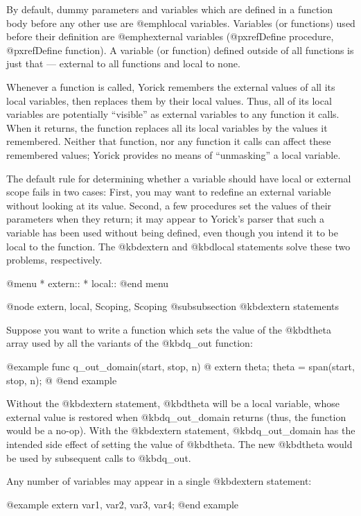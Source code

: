{By default, dummy parameters and variables which are defined in a
function body before any other use are @emph{local} variables.
Variables (or functions) used before their definition are
@emph{external} variables (@pxref{Define procedure}, @pxref{Define
function}).  A variable (or function) defined outside of all functions
is just that --- external to all functions and local to none.

Whenever a function is called, Yorick remembers the external values of
all its local variables, then replaces them by their local values.
Thus, all of its local variables are potentially ``visible'' as external
variables to any function it calls.  When it returns, the function
replaces all its local variables by the values it remembered.  Neither
that function, nor any function it calls can affect these remembered
values; Yorick provides no means of ``unmasking'' a local variable.

The default rule for determining whether a variable should have local or
external scope fails in two cases: First, you may want to redefine an
external variable without looking at its value.  Second, a few
procedures set the values of their parameters when they return; it may
appear to Yorick's parser that such a variable has been used without
being defined, even though you intend it to be local to the function.
The @kbd{extern} and @kbd{local} statements solve these two problems,
respectively.

@menu
* extern::                      
* local::                       
@end menu

@node extern, local, Scoping, Scoping
@subsubsection @kbd{extern} statements

Suppose you want to write a function which sets the value of the
@kbd{theta} array used by all the variants of the @kbd{q_out}
function:

@example
func q_out_domain(start, stop, n)
@{
  extern theta;
  theta = span(start, stop, n);
@}
@end example

Without the @kbd{extern} statement, @kbd{theta} will be a local
variable, whose external value is restored when @kbd{q_out_domain}
returns (thus, the function would be a no-op).  With the @kbd{extern}
statement, @kbd{q_out_domain} has the intended side effect of setting
the value of @kbd{theta}.  The new @kbd{theta} would be used by
subsequent calls to @kbd{q_out}.

Any number of variables may appear in a single @kbd{extern} statement:

@example
extern var1, var2, var3, var4;
@end example


}
